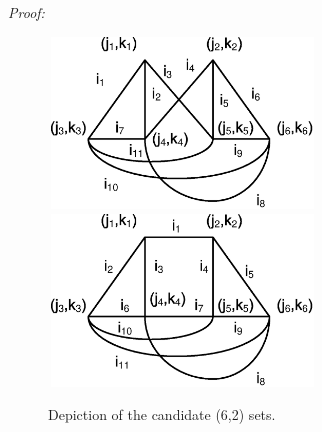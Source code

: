 \noindent \textit{Proof:}
\begin{figure}
\center\includegraphics[width=2.8in,height=1.8in]{Drawing30_2.eps}
\center\includegraphics[width=2.8in,height=1.8in]{Drawing32_1.eps}\hspace{0.3in}
\caption{Depiction of the candidate (6,2) sets.} \label{fig62}
\end{figure}
